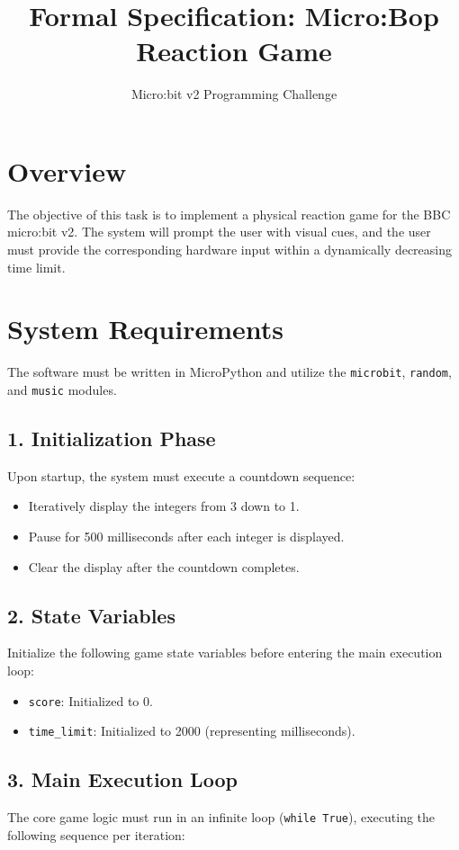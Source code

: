 \documentclass[12pt, a4paper]{article}
\title{\textbf{Formal Specification: Micro:Bop Reaction Game}}
\author{Micro:bit v2 Programming Challenge}
\date{}
\begin{document}
\maketitle

\section*{Overview}
The objective of this task is to implement a physical reaction game for the BBC micro:bit v2. The system will prompt the user with visual cues, and the user must provide the corresponding hardware input within a dynamically decreasing time limit. 

\section*{System Requirements}
The software must be written in MicroPython and utilize the \texttt{microbit}, \texttt{random}, and \texttt{music} modules. 

\subsection*{1. Initialization Phase}
Upon startup, the system must execute a countdown sequence:
\begin{itemize}
    \item Iteratively display the integers from 3 down to 1.
    \item Pause for 500 milliseconds after each integer is displayed.
    \item Clear the display after the countdown completes.
\end{itemize}

\subsection*{2. State Variables}
Initialize the following game state variables before entering the main execution loop:
\begin{itemize}
    \item \texttt{score}: Initialized to 0.
    \item \texttt{time\_limit}: Initialized to 2000 (representing milliseconds).
\end{itemize}

\subsection*{3. Main Execution Loop}
The core game logic must run in an infinite loop (\texttt{while True}), executing the following sequence per iteration:
\end{document}
